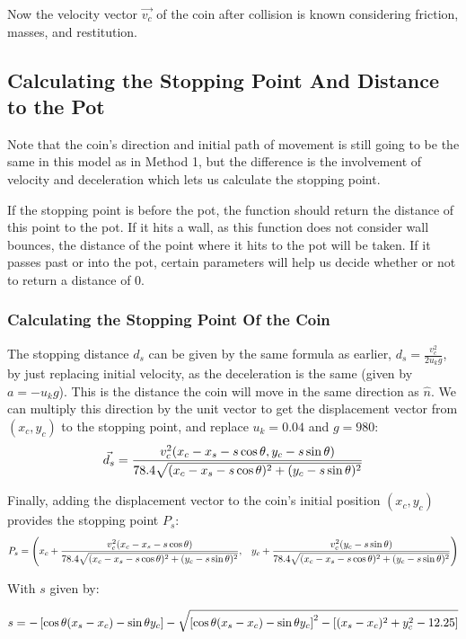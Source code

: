 \documentclass[10pt]{article}
\begin{document}
Now the velocity vector $\vec{v_c}$ of the coin after collision is known considering friction, masses, and restitution.

\subsection{Calculating the Stopping Point And Distance to the Pot}

Note that the coin's direction and initial path of movement is still going to be the same in this model as in Method 1, but the difference is the involvement of velocity and deceleration which lets us calculate the stopping point.

If the stopping point is before the pot, the function should return the distance of this point to the pot. If it hits a wall, as this function does not consider wall bounces, the distance of the point where it hits to the pot will be taken. If it passes past or into the pot, certain parameters will help us decide whether or not to return a distance of 0.

\subsubsection{Calculating the Stopping Point Of the Coin}

The stopping distance $d_s$ can be given by the same formula as earlier, $d_s = \frac{v_c^2}{2u_kg}$, by just replacing initial velocity, as the deceleration is the same (given by $a = -u_kg$). This is the distance the coin will move in the same direction as $\hat{n}$. We can multiply this direction by the unit vector to get the displacement vector from $(x_c,y_c)$ to the stopping point, and replace $u_k = 0.04$ and $g=980$:
\[
\small
\vec{d_s} = \frac{v_c^2(x_c - x_s - s \cos \theta, y_c - s\sin\theta)}{78.4\sqrt{(x_c - x_s - s \cos \theta)^2 + (y_c - s\sin\theta)^2}}
\]

Finally, adding the displacement vector to the coin's initial position $(x_c,y_c)$ provides the stopping point $P_s$:
\begin{align*}
\small
P_s = \Bigg(
    &x_c + \frac{v_c^2(x_c - x_s - s \cos \theta)}
    {78.4 \sqrt{(x_c - x_s - s \cos \theta)^2 + (y_c - s \sin \theta)^2}}, 
    &y_c + \frac{v_c^2(y_c - s \sin \theta)}
    {78.4 \sqrt{(x_c - x_s - s \cos \theta)^2 + (y_c - s \sin \theta)^2}}
\Bigg)
\end{align*}

With $s$ given by:

\[
\small
s = -\left[\cos \theta (x_s - x_c) - \sin \theta y_c\right] 
- 
\sqrt{
\left[\cos \theta (x_s - x_c) - \sin \theta y_c\right]^2 
- 
\left[(x_s - x_c)^2 + y_c^2 - 12.25\right]
}
\]
\end{document}
